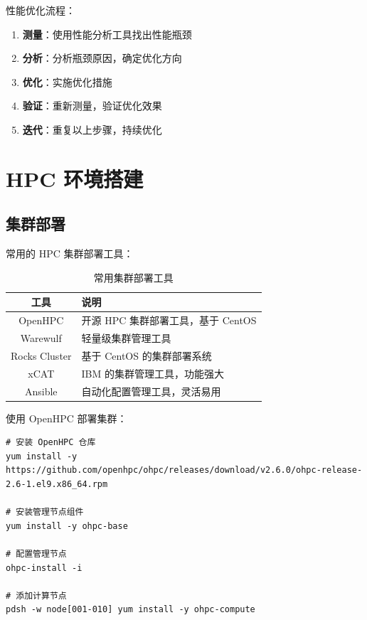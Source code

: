 \documentclass[12pt,UTF8]{ctexbook}
\begin{document}
性能优化流程：
\begin{enumerate}
    \item \textbf{测量}：使用性能分析工具找出性能瓶颈
    \item \textbf{分析}：分析瓶颈原因，确定优化方向
    \item \textbf{优化}：实施优化措施
    \item \textbf{验证}：重新测量，验证优化效果
    \item \textbf{迭代}：重复以上步骤，持续优化
\end{enumerate}

\chapter{HPC 环境搭建}
\label{chap:hpc_setup}

\section{集群部署}
\label{sec:cluster_deployment}

常用的 HPC 集群部署工具：

\begin{table}[htbp]
    \centering
    \caption{常用集群部署工具}
    \begin{tabular}{|c|p{8cm}|}
        \hline
        \textbf{工具} & \textbf{说明} \\
        \hline
        OpenHPC & 开源 HPC 集群部署工具，基于 CentOS \\
        \hline
        Warewulf & 轻量级集群管理工具 \\
        \hline
        Rocks Cluster & 基于 CentOS 的集群部署系统 \\
        \hline
        xCAT & IBM 的集群管理工具，功能强大 \\
        \hline
        Ansible & 自动化配置管理工具，灵活易用 \\
        \hline
    \end{tabular}
\end{table}

使用 OpenHPC 部署集群：
\begin{verbatim}
# 安装 OpenHPC 仓库
yum install -y https://github.com/openhpc/ohpc/releases/download/v2.6.0/ohpc-release-2.6-1.el9.x86_64.rpm

# 安装管理节点组件
yum install -y ohpc-base

# 配置管理节点
ohpc-install -i

# 添加计算节点
pdsh -w node[001-010] yum install -y ohpc-compute
\end{verbatim}
\end{document}
